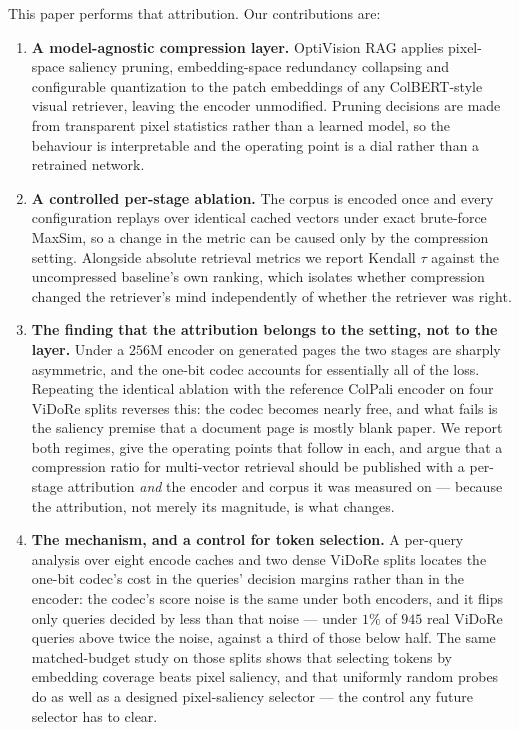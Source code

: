 \documentclass[conference]{IEEEtran}
\begin{document}
This paper performs that attribution. Our contributions are:

\begin{enumerate}
\item \textbf{A model-agnostic compression layer.} OptiVision RAG applies
pixel-space saliency pruning, embedding-space redundancy collapsing and
configurable quantization to the patch embeddings of any ColBERT-style visual
retriever, leaving the encoder unmodified. Pruning decisions are made from
transparent pixel statistics rather than a learned model, so the behaviour is
interpretable and the operating point is a dial rather than a retrained network.
\item \textbf{A controlled per-stage ablation.} The corpus is encoded once and
every configuration replays over identical cached vectors under exact
brute-force MaxSim, so a change in the metric can be caused only by the
compression setting. Alongside absolute retrieval metrics we report Kendall
$\tau$ against the uncompressed baseline's own ranking, which isolates whether
compression changed the retriever's mind independently of whether the retriever
was right.
\item \textbf{The finding that the attribution belongs to the setting, not to
the layer.} Under a $256$M encoder on generated pages the two stages are sharply
asymmetric, and the one-bit codec accounts for essentially all of the loss.
Repeating the identical ablation with the reference ColPali encoder on four
ViDoRe splits reverses this: the codec becomes nearly free, and what fails is the
saliency premise that a document page is mostly blank paper. We report both
regimes, give the operating points that follow in each, and argue that a
compression ratio for multi-vector retrieval should be published with a per-stage
attribution \emph{and} the encoder and corpus it was measured on --- because the
attribution, not merely its magnitude, is what changes.
\item \textbf{The mechanism, and a control for token selection.} A per-query
analysis over eight encode caches and two dense ViDoRe splits locates the
one-bit codec's cost in the queries' decision margins rather than in the
encoder: the codec's score noise is the same under both encoders, and it flips
only queries decided by less than that noise --- under $1\%$ of $945$ real
ViDoRe queries above twice the noise, against a third of those below half. The
same matched-budget study on those splits shows that
selecting tokens by embedding coverage beats pixel saliency, and that uniformly
random probes do as well as a designed pixel-saliency selector --- the control
any future selector has to clear.
\end{enumerate}
\end{document}
